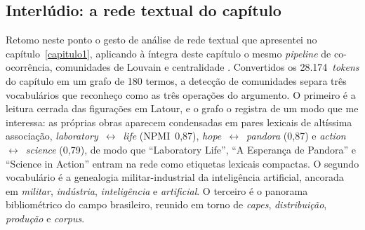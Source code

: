 %
%

\subsection*{Interlúdio: a rede textual do capítulo}

Retomo neste ponto o gesto de análise de rede textual que apresentei no
capítulo~\ref{capitulo1}, aplicando à íntegra deste capítulo o mesmo
\textit{pipeline} de co-ocorrência, comunidades de Louvain
\parencite{blondel2008fast} e centralidade
\parencite{paranyushkin2019infranodus}. Convertidos os
28.174~\textit{tokens} do capítulo em um grafo de 180 termos, a
detecção de comunidades separa três vocabulários que reconheço como as
três operações do argumento. O primeiro é a leitura cerrada das
figurações em Latour, e o grafo o registra de um modo que me interessa:
as próprias obras aparecem condensadas em pares lexicais de altíssima
associação, \textit{laboratory}~$\leftrightarrow$~\textit{life}
(NPMI~0,87), \textit{hope}~$\leftrightarrow$~\textit{pandora}
(0,87) e \textit{action}~$\leftrightarrow$~\textit{science}
(0,79), de modo que \enquote{Laboratory Life}, \enquote{A Esperança
de Pandora} e \enquote{Science in Action} entram na rede como
etiquetas lexicais compactas. O segundo vocabulário é a genealogia
militar-industrial da inteligência artificial, ancorada em
\textit{militar}, \textit{indústria}, \textit{inteligência} e
\textit{artificial}. O terceiro é o panorama bibliométrico do campo
brasileiro, reunido em torno de \textit{capes}, \textit{distribuição},
\textit{produção} e \textit{corpus}.

